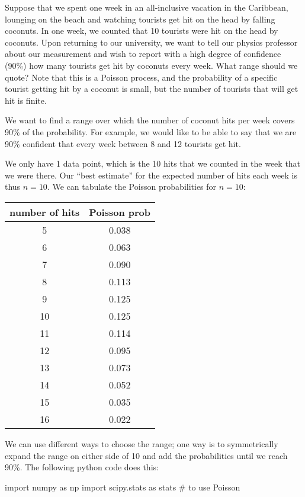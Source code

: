 \begin{example}{Suppose that we spent one week in an all-inclusive vacation in the Caribbean, lounging on the beach and watching tourists get hit on the head by falling coconuts. In one week, we counted that 10 tourists were hit on the head by coconuts. Upon returning to our university, we want to tell our physics professor about our measurement and wish to report with a high degree of confidence (90\%) how many tourists get hit by coconuts every week. What range should we quote?}
\label{ex:PoissonCoconut}
Note that this is a Poisson process, and the probability of a specific tourist getting hit by a coconut is small, but the number of tourists that will get hit is finite.

We want to find a range over which the number of coconut hits per week covers 90\% of the probability. For example, we would like to be able to say that we are 90\% confident that every week between 8 and 12 tourists get hit. 

We only have 1 data point, which is the 10 hits that we counted in the week that we were there. Our ``best estimate'' for the expected number of hits each week is thus $n=10$. We can tabulate the Poisson probabilities for $n=10$:

\begin{center}
\begin{tabular}{|c|c|}
\hline
number of hits & Poisson prob\\
\hline
5 & 0.038 \\
\hline
6 & 0.063 \\
\hline
7 & 0.090 \\
\hline
8 & 0.113 \\
\hline
9 & 0.125 \\
\hline
\cellcolor{gray!25} 10 & \cellcolor{gray!25} 0.125 \\
\hline
11 & 0.114 \\
\hline
12 & 0.095 \\
\hline
13 & 0.073 \\
\hline
14 & 0.052 \\
\hline
15 & 0.035 \\
\hline
16 & 0.022 \\
\hline
\end{tabular}
\end{center}

We can use different ways to choose the range; one way is to symmetrically expand the range on either side of 10 and add the probabilities until we reach 90\%. The following python code does this:
\begin{python}[caption = Computing a 90\% confidence interval] 
import numpy as np
import scipy.stats as stats # to use Poisson


\end{python}
\end{example}
